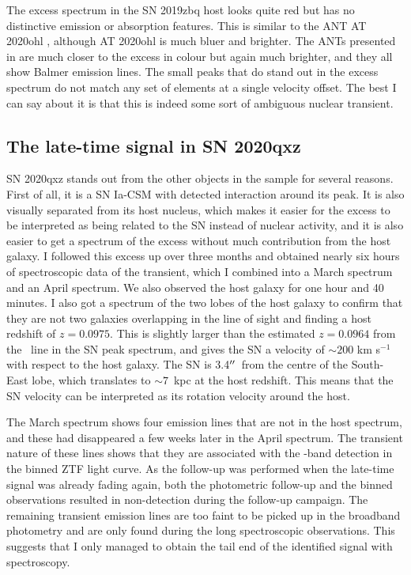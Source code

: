 \documentclass[a4paper,oneside,12pt, class=Latex/Classes/PhDthesisPSnPDF, crop=false]{standalone}
\begin{document}
The excess spectrum in the SN 2019zbq host looks quite red but has no distinctive emission or absorption features. This is similar to the ANT AT 2020ohl \citep{2020ohl_Hinkle}, although AT 2020ohl is much bluer and brighter. The ANTs presented in \citet{wiseman_ztfants} are much closer to the excess in colour but again much brighter, and they all show Balmer emission lines. The small peaks that do stand out in the excess spectrum do not match any set of elements at a single velocity offset. The best I can say about it is that this is indeed some sort of ambiguous nuclear transient.


\subsection{The late-time signal in SN 2020qxz}
\label{2020qzx_discussion}
SN 2020qxz stands out from the other objects in the sample for several reasons. First of all, it is a SN Ia-CSM with detected interaction around its peak. It is also visually separated from its host nucleus, which makes it easier for the excess to be interpreted as being related to the SN instead of nuclear activity, and it is also easier to get a spectrum of the excess without much contribution from the host galaxy. I followed this excess up over three months and obtained nearly six hours of spectroscopic data of the transient, which I combined into a March spectrum and an April spectrum. We also observed the host galaxy for one hour and 40 minutes. I also got a spectrum of the two lobes of the host galaxy to confirm that they are not two galaxies overlapping in the line of sight and finding a host redshift of $z=0.0975$. This is slightly larger than the estimated $z=0.0964$ from the \Halpha\ line in the SN peak spectrum, and gives the SN a velocity of $\sim200$ km s$^{-1}$ with respect to the host galaxy. The SN is 3.4$^{\prime\prime}$\ from the centre of the South-East lobe, which translates to $\sim7$~kpc at the host redshift. This means that the SN velocity can be interpreted as its rotation velocity around the host.

The March spectrum shows four emission lines that are not in the host spectrum, and these had disappeared a few weeks later in the April spectrum. The transient nature of these lines shows that they are associated with the \ztfi-band detection in the binned ZTF light curve. As the follow-up was performed when the late-time signal was already fading again, both the photometric follow-up and the binned observations resulted in non-detection during the follow-up campaign. The remaining transient emission lines are too faint to be picked up in the broadband photometry and are only found during the long spectroscopic observations. This suggests that I only managed to obtain the tail end of the identified signal with spectroscopy.
\end{document}
